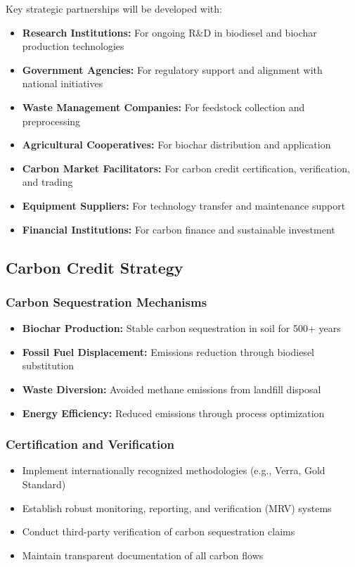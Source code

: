 Key strategic partnerships will be developed with:

\begin{itemize}
    \item \textbf{Research Institutions:} For ongoing R\&D in biodiesel and biochar production technologies
    \item \textbf{Government Agencies:} For regulatory support and alignment with national initiatives
    \item \textbf{Waste Management Companies:} For feedstock collection and preprocessing
    \item \textbf{Agricultural Cooperatives:} For biochar distribution and application
    \item \textbf{Carbon Market Facilitators:} For carbon credit certification, verification, and trading
    \item \textbf{Equipment Suppliers:} For technology transfer and maintenance support
    \item \textbf{Financial Institutions:} For carbon finance and sustainable investment
\end{itemize}

\subsection{Carbon Credit Strategy}

\subsubsection{Carbon Sequestration Mechanisms}
\begin{itemize}
    \item \textbf{Biochar Production:} Stable carbon sequestration in soil for 500+ years
    \item \textbf{Fossil Fuel Displacement:} Emissions reduction through biodiesel substitution
    \item \textbf{Waste Diversion:} Avoided methane emissions from landfill disposal
    \item \textbf{Energy Efficiency:} Reduced emissions through process optimization
\end{itemize}

\subsubsection{Certification and Verification}
\begin{itemize}
    \item Implement internationally recognized methodologies (e.g., Verra, Gold Standard)
    \item Establish robust monitoring, reporting, and verification (MRV) systems
    \item Conduct third-party verification of carbon sequestration claims
    \item Maintain transparent documentation of all carbon flows
\end{itemize}


